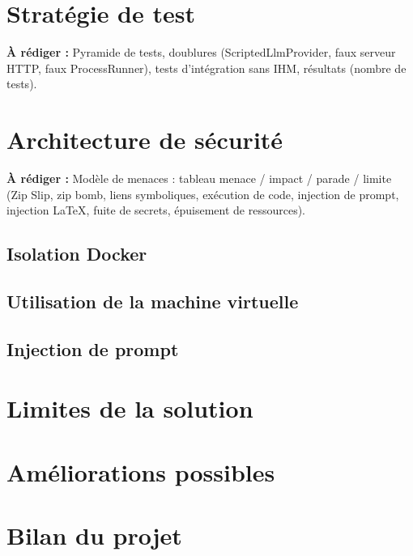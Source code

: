 \documentclass[11pt,a4paper]{report}
\newcommand{\todo}[1]{\par\noindent\colorbox{yellow!30}{\parbox{\dimexpr\linewidth-2\fboxsep}{\textbf{À rédiger :} #1}}\par}
\begin{document}
\chapter{Stratégie de test}                               %
\todo{Pyramide de tests, doublures (ScriptedLlmProvider, faux serveur HTTP, faux ProcessRunner), tests d'intégration sans IHM, résultats (nombre de tests).}

\chapter{Architecture de sécurité}                        %
\todo{Modèle de menaces : tableau menace / impact / parade / limite (Zip Slip, zip bomb, liens symboliques, exécution de code, injection de prompt, injection LaTeX, fuite de secrets, épuisement de ressources).}
\section{Isolation Docker}                                %
\section{Utilisation de la machine virtuelle}             %
\section{Injection de prompt}                             %

\chapter{Limites de la solution}                          %
\chapter{Améliorations possibles}                         %
\chapter{Bilan du projet}                                 %

\appendix
\end{document}
